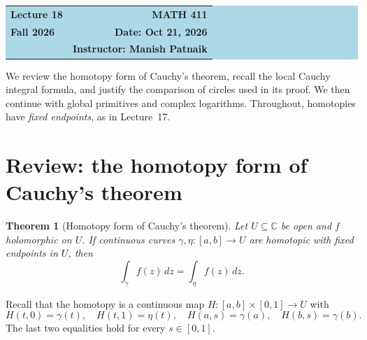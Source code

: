 \documentclass[11pt]{article}
\theoremstyle{plain}
\newtheorem{theorem}{Theorem}[section]
\theoremstyle{definition}
\theoremstyle{remark}
\numberwithin{equation}{section}
\newcommand{\C}{\mathbb{C}}
\begin{document}
\begin{center}
  \colorbox{lightblue}{%
    \begin{minipage}{0.94\textwidth}
      \vspace{0.55em}
      \begin{tabular*}{\textwidth}{@{\extracolsep{\fill}}lr}
        {\color{courseblue}\bfseries\LARGE Lecture 18} &
        {\color{courseblue}\bfseries\LARGE MATH 411}\\[0.35em]
        \textbf{Fall 2026} & \textbf{Date: Oct 21, 2026}\\
        & \textbf{Instructor: Manish Patnaik}
      \end{tabular*}
      \vspace{0.45em}
    \end{minipage}}
\end{center}

\setcounter{tocdepth}{1}
\tableofcontents
\vspace{0.45em}


We review the homotopy form of Cauchy's theorem, recall the local Cauchy
integral formula, and justify the comparison of circles used in its proof.
We then continue with global primitives and complex logarithms.
Throughout, homotopies have \emph{fixed endpoints}, as in Lecture~17.

\section{Review: the homotopy form of Cauchy's theorem}
\begin{theorem}[Homotopy form of Cauchy's theorem]\label{thm:homotopy}
Let $U\subseteq\C$ be open and $f$ holomorphic on $U$.
If continuous curves $\gamma,\eta\colon[a,b]\to U$ are homotopic
with fixed endpoints in $U$, then
\[
 \boxed{\displaystyle\int_\gamma f(z)\,dz=\int_\eta f(z)\,dz.}
\]
\end{theorem}
Recall that the homotopy is a continuous map
$H\colon[a,b]\times[0,1]\to U$ with
\[
 H(t,0)=\gamma(t),\quad H(t,1)=\eta(t),\quad
 H(a,s)=\gamma(a),\quad H(b,s)=\gamma(b).
\]
The last two equalities hold for every $s\in[0,1]$.
\end{document}
